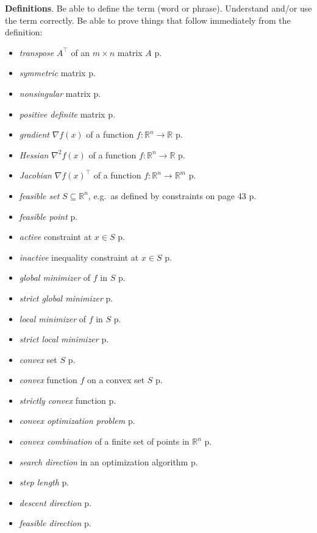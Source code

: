 \documentclass[12pt]{amsart}
\newcommand{\bigspacing}{\renewcommand{\baselinestretch}{1.13}\tiny\normalsize}
\newcommand{\RR}{{\mathbb{R}}}
\newcommand{\grad}{\nabla}
\begin{document}
\vfill

\newcommand{\pb}{\hfill p.~\underline{\phantom{foobar}}}
\newcommand{\psb}{\hfill pp.~\underline{\phantom{foobar}}}

\medskip
\bigspacing
\noindent \textbf{Definitions}.  Be able to define the term (word or phrase).  Understand and/or use the term correctly.  Be able to prove things that follow immediately from the definition:
\begin{itemize}
\item \emph{transpose} $A^\top$ of an $m\times n$ matrix $A$ \pb
\item \emph{symmetric} matrix \pb
\item \emph{nonsingular} matrix \pb
\item \emph{positive definite} matrix \pb
\item \emph{gradient} $\grad f(x)$ of a function $f:\RR^n\to\RR$ \pb
\item \emph{Hessian} $\grad^2 f(x)$ of a function $f:\RR^n\to\RR$ \pb
\item \emph{Jacobian} $\grad f(x)^\top$ of a function $f:\RR^n\to\RR^m$ \pb
\item \emph{feasible set} $S \subseteq \RR^n$, e.g.~as defined by constraints on page 43 \pb
\item \emph{feasible point} \pb
\item \emph{active} constraint at $x\in S$ \pb
\item \emph{inactive} inequality constraint at $x\in S$ \pb
\item \emph{global minimizer} of $f$ in $S$ \pb
\item \emph{strict global minimizer} \pb
\item \emph{local minimizer} of $f$ in $S$ \pb
\item \emph{strict local minimizer} \pb
\item \emph{convex} set $S$ \pb
\item \emph{convex} function $f$ on a convex set $S$ \pb
\item \emph{strictly convex} function \pb
\item \emph{convex optimization problem} \pb
\item \emph{convex combination} of a finite set of points in $\RR^n$ \pb
\item \emph{search direction} in an optimization algorithm \pb
\item \emph{step length} \pb
\item \emph{descent direction} \pb
\item \emph{feasible direction} \pb

\end{itemize}
\end{document}
